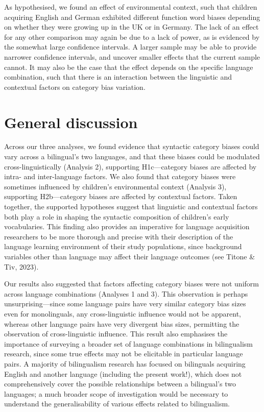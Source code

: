 \documentclass[10pt, letterpaper]{article}
\begin{document}
As hypothesised, we found an effect of environmental context, such that
children acquiring English and German exhibited different function word
biases depending on whether they were growing up in the UK or in
Germany. The lack of an effect for any other comparison may again be due
to a lack of power, as is evidenced by the somewhat large confidence
intervals. A larger sample may be able to provide narrower confidence
intervals, and uncover smaller effects that the current sample cannot.
It may also be the case that the effect depends on the specific language
combination, such that there is an interaction between the linguistic
and contextual factors on category bias variation.

\section{General discussion}\label{general-discussion}

Across our three analyses, we found evidence that syntactic category
biases could vary across a bilingual's two languages, and that these
biases could be modulated cross-linguistically (Analysis 2), supporting
H1c---category biases are affected by intra- and inter-language factors.
We also found that category biases were sometimes influenced by
children's environmental context (Analysis 3), supporting H2b---category
biases are affected by contextual factors. Taken together, the supported
hypotheses suggest that linguistic and contextual factors both play a
role in shaping the syntactic composition of children's early
vocabularies. This finding also provides an imperative for language
acquisition researchers to be more thorough and precise with their
description of the language learning environment of their study
populations, since background variables other than language may affect
their language outcomes (see Titone \& Tiv, 2023).

Our results also suggested that factors affecting category biases were
not uniform across language combinations (Analyses 1 and 3). This
observation is perhaps unsurprising---since some language pairs have
very similar category bias sizes even for monolinguals, any
cross-linguistic influence would not be apparent, whereas other language
pairs have very divergent bias sizes, permitting the observation of
cross-linguistic influence. This result also emphasises the importance
of surveying a broader set of language combinations in bilingualism
research, since some true effects may not be elicitable in particular
language pairs. A majority of bilingualism research has focused on
bilinguals acquiring English and another language (including the present
work!), which does not comprehensively cover the possible relationships
between a bilingual's two languages; a much broader scope of
investigation would be necessary to understand the generalisability of
various effects related to bilingualism.
\end{document}
